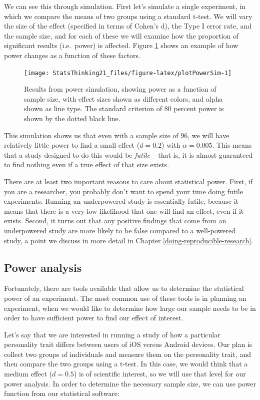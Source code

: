 \documentclass[12pt,]{book}
\theoremstyle{definition}
\theoremstyle{definition}
\theoremstyle{definition}
\theoremstyle{remark}
\begin{document}
We can see this through simulation. First let's simulate a single experiment, in which we compare the means of two groups using a standard t-test. We will vary the size of the effect (specified in terms of Cohen's d), the Type I error rate, and the sample size, and for each of these we will examine how the proportion of significant results (i.e.~power) is affected. Figure \ref{fig:plotPowerSim} shows an example of how power changes as a function of these factors.

\begin{figure}
\texttt{[image: StatsThinking21\_files/figure-latex/plotPowerSim-1]} \caption{Results from power simulation, showing power as a function of sample size, with effect sizes shown as different colors, and alpha shown as line type. The standard criterion of 80 percent power is shown by the dotted black line.}\label{fig:plotPowerSim}
\end{figure}

This simulation shows us that even with a sample size of 96, we will have relatively little power to find a small effect (\(d = 0.2\)) with \(\alpha = 0.005\). This means that a study designed to do this would be \emph{futile} -- that is, it is almost guaranteed to find nothing even if a true effect of that size exists.

There are at least two important reasons to care about statistical power. First, if you are a researcher, you probably don't want to spend your time doing futile experiments. Running an underpowered study is essentially futile, because it means that there is a very low likelihood that one will find an effect, even if it exists. Second, it turns out that any positive findings that come from an underpowered study are more likely to be false compared to a well-powered study, a point we discuss in more detail in Chapter \ref{doing-reproducible-research}.

\hypertarget{power-analysis}{%
\subsection{Power analysis}\label{power-analysis}}

Fortunately, there are tools available that allow us to determine the statistical power of an experiment. The most common use of these tools is in planning an experiment, when we would like to determine how large our sample needs to be in order to have sufficient power to find our effect of interest.

Let's say that we are interested in running a study of how a particular personality trait differs between users of iOS versus Android devices. Our plan is collect two groups of individuals and measure them on the personality trait, and then compare the two groups using a t-test. In this case, we would think that a medium effect (\(d = 0.5\)) is of scientific interest, so we will use that level for our power analysis. In order to determine the necessary sample size, we can use power function from our statistical software:
\end{document}
